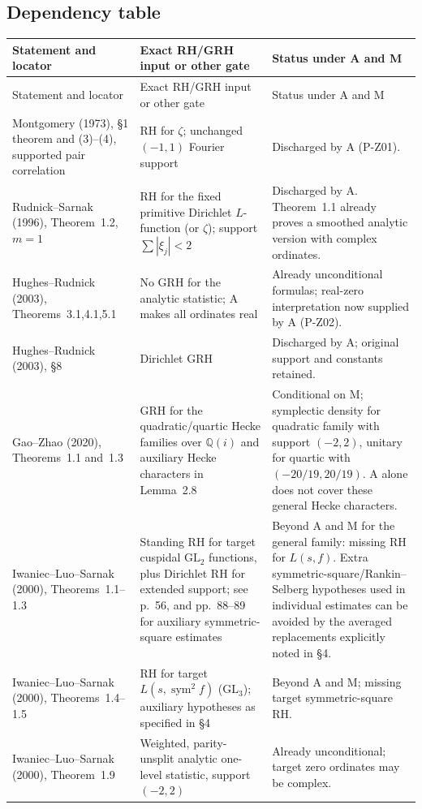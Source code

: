 \subsection{Dependency table}
\begingroup\small
\begin{longtable}{p{}p{}p{}}
\hline
Statement and locator & Exact RH/GRH input or other gate & Status under A and M\\\hline
\endfirsthead
\hline
Statement and locator & Exact RH/GRH input or other gate & Status under A and M\\\hline
\endhead
Montgomery (1973), \S1 theorem and (3)--(4), supported pair correlation & RH for $\zeta$; unchanged $(-1,1)$ Fourier support & Discharged by A (P-Z01).\\
Rudnick--Sarnak (1996), Theorem~1.2, $m=1$ & RH for the fixed primitive Dirichlet $L$-function (or $\zeta$); support $\sum|\xi_j|<2$ & Discharged by A. Theorem~1.1 already proves a smoothed analytic version with complex ordinates.\\
Hughes--Rudnick (2003), Theorems~3.1,4.1,5.1 & No GRH for the analytic statistic; A makes all ordinates real & Already unconditional formulas; real-zero interpretation now supplied by A (P-Z02).\\
Hughes--Rudnick (2003), \S8 & Dirichlet GRH & Discharged by A; original support and constants retained.\\
Gao--Zhao (2020), Theorems~1.1 and~1.3 & GRH for the quadratic/quartic Hecke families over $\mathbb Q(i)$ and auxiliary Hecke characters in Lemma~2.8 & Conditional on M; symplectic density for quadratic family with support $(-2,2)$, unitary for quartic with $(-20/19,20/19)$. A alone does not cover these general Hecke characters.\\
Iwaniec--Luo--Sarnak (2000), Theorems~1.1--1.3 & Standing RH for target cuspidal $\mathrm{GL}_2$ functions, plus Dirichlet RH for extended support; see p.~56, and pp.~88--89 for auxiliary symmetric-square estimates & Beyond A and M for the general family: missing RH for $L(s,f)$. Extra symmetric-square/Rankin--Selberg hypotheses used in individual estimates can be avoided by the averaged replacements explicitly noted in \S4.\\
Iwaniec--Luo--Sarnak (2000), Theorems~1.4--1.5 & RH for target $L(s,\operatorname{sym}^2f)$ ($\mathrm{GL}_3$); auxiliary hypotheses as specified in \S4 & Beyond A and M; missing target symmetric-square RH.\\
Iwaniec--Luo--Sarnak (2000), Theorem~1.9 & Weighted, parity-unsplit analytic one-level statistic, support $(-2,2)$ & Already unconditional; target zero ordinates may be complex.\\

\end{longtable}
